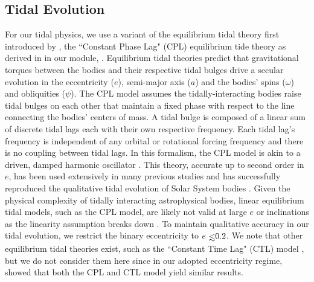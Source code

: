 
\subsection{Tidal Evolution} \label{sec:tidal_evolution}

For our tidal physics, we use a variant of the equilibrium tidal theory first introduced by \citet{Darwin1880}, the ``Constant Phase Lag" (CPL) equilibrium tide theory as derived in \citet{FerrazMello2008} in our module, \eqtide.  Equilibrium tidal theories predict that gravitational torques between the bodies and their respective tidal bulges drive a secular evolution in the eccentricity ($e$), semi-major axis ($a$) and the bodies' spins ($\omega$) and obliquities ($\psi$).  The CPL model assumes the tidally-interacting bodies raise tidal bulges on each other that maintain a fixed phase with respect to the line connecting the bodies' centers of mass.  A tidal bulge is composed of a linear sum of discrete tidal lags each with their own respective frequency.  Each tidal lag's frequency is independent of any orbital or rotational forcing frequency and there is no coupling between tidal lags.  In this formalism, the CPL model is akin to a driven, damped harmonic oscillator \citep{Greenberg2009}.  This theory, accurate up to second order in $e$, has been used extensively in many previous studies \citep[e.g.][]{Leconte2010,Heller2011,Barnes2013} and has successfully reproduced the qualitative tidal evolution of Solar System bodies \citep[e.g.][]{Goldreich1966}.  Given the physical complexity of tidally interacting astrophysical bodies, linear equilibrium tidal models, such as the CPL model, are likely not valid at large $e$ or inclinations as the linearity assumption breaks down \citep{FerrazMello2008,Greenberg2009}.  To maintain qualitative accuracy in our tidal evolution, we restrict the binary eccentricity to $e \lsim 0.2$.  We note that other equilibrium tidal theories exist, such as the ``Constant Time Lag" (CTL) model \citep[e.g.][]{Hut1981}, but we do not consider them here since in our adopted eccentricity regime, \citet{Leconte2010} showed that both the CPL and CTL model yield similar results.

